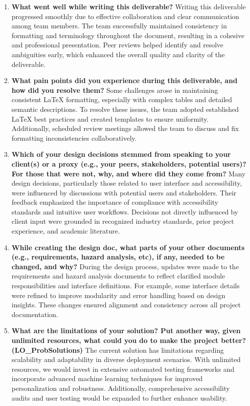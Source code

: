 \documentclass[12pt, titlepage]{article}
\begin{document}
% 
\begin{enumerate}
  \item \textbf{What went well while writing this deliverable?}  
  Writing this deliverable progressed smoothly due to effective collaboration and clear communication among team members. The team successfully maintained consistency in formatting and terminology throughout the document, resulting in a cohesive and professional presentation. Peer reviews helped identify and resolve ambiguities early, which enhanced the overall quality and clarity of the deliverable.

  \item \textbf{What pain points did you experience during this deliverable, and how did you resolve them?}  
  Some challenges arose in maintaining consistent LaTeX formatting, especially with complex tables and detailed semantic descriptions. To resolve these issues, the team adopted established LaTeX best practices and created templates to ensure uniformity. Additionally, scheduled review meetings allowed the team to discuss and fix formatting inconsistencies collaboratively.

  \item \textbf{Which of your design decisions stemmed from speaking to your client(s) or a proxy (e.g., your peers, stakeholders, potential users)? For those that were not, why, and where did they come from?}  
  Many design decisions, particularly those related to user interface and accessibility, were influenced by discussions with potential users and stakeholders. Their feedback emphasized the importance of compliance with accessibility standards and intuitive user workflows. Decisions not directly influenced by client input were grounded in recognized industry standards, prior project experience, and academic literature.

  \item \textbf{While creating the design doc, what parts of your other documents (e.g., requirements, hazard analysis, etc), if any, needed to be changed, and why?}  
  During the design process, updates were made to the requirements and hazard analysis documents to reflect clarified module responsibilities and interface definitions. For example, some interface details were refined to improve modularity and error handling based on design insights. These changes ensured alignment and consistency across all project documentation.

  \item \textbf{What are the limitations of your solution? Put another way, given unlimited resources, what could you do to make the project better? (LO\_ProbSolutions)}  
  The current solution has limitations regarding scalability and adaptability in diverse deployment scenarios. With unlimited resources, we would invest in extensive automated testing frameworks and incorporate advanced machine learning techniques for improved personalization and robustness. Additionally, comprehensive accessibility audits and user testing would be expanded to further enhance usability.


\end{enumerate}
\end{document}

